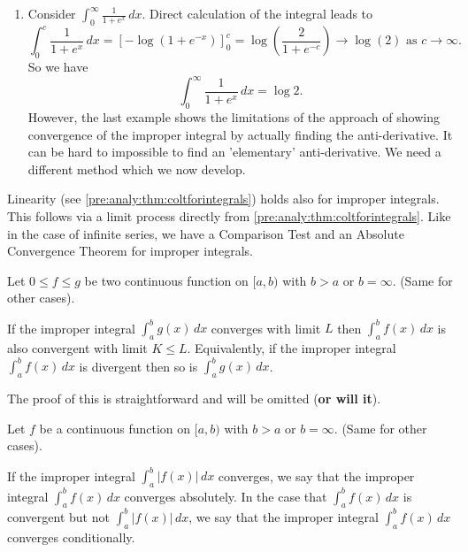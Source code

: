 \documentclass[10pt, a4paper]{article}
\newcommand{\limas}[3][n]{#2 \rightarrow #3 \text{ as } #1 \rightarrow \infty}
\begin{document}
\begin{enumerate}[label = (\alph*)]
    \item Consider $\displaystyle\int_{0}^{\infty}\frac{1}{1 + e ^ x}\,dx$.
    Direct calculation of the integral leads to
    \[
    \limas[c]{\int_{0}^{c}\frac{1}{1 + e ^ x}\,dx = [-\log(1 + e ^ {-x})]_{0}^{c} = \log\left(\frac{2}{1 + e ^ {-c}}\right)}{\log(2)}.
    \]
    So we have
    \[
    \int_{0}^{\infty}\frac{1}{1 + e ^ x}\,dx = \log{2}.
    \]
    However,
    the last example shows the limitations of the approach of showing convergence of the improper integral by actually finding the anti-derivative.
    It can be hard to impossible to find an 'elementary' anti-derivative.
    We need a different method which we now develop.
\end{enumerate}

Linearity
(see \autoref{pre:analy:thm:coltforintegrals})
holds also for improper integrals.
This follows via a limit process directly from \autoref{pre:analy:thm:coltforintegrals}.
Like in the case of infinite series,
we have a Comparison Test and an Absolute Convergence Theorem for improper integrals.

\begin{theorem}
    Let $0 \leq f \leq g$ be two continuous function on $[a, b)$ with $b > a$ or $b = \infty$.
    (Same for other cases).

    If the improper integral $\int_{a}^{b}g(x)\,dx$ converges with limit $L$ then $\int_{a}^{b}f(x)\,dx$ is also convergent with limit $K \leq L$.
    Equivalently,
    if the improper integral $\int_{a}^{b}f(x)\,dx$ is divergent then so is $\int_{a}^{b}g(x)\,dx$.
\end{theorem}
The proof of this is straightforward and will be omitted
(\textbf{or will it}).

\begin{definition}
    Let $f$ be a continuous function on $[a, b)$ with $b > a$ or $b = \infty$.
    (Same for other cases).

    If the improper integral $\int_{a}^{b}|f(x)|\,dx$ converges,
    we say that the improper integral $\int_{a}^{b}f(x)\,dx$ converges absolutely.
    In the case that $\int_{a}^{b}f(x)\,dx$ is convergent but not $\int_{a}^{b}|f(x)|\,dx$,
    we say that the improper integral $\int_{a}^{b}f(x)\,dx$ converges conditionally.
\end{definition}
\end{document}
